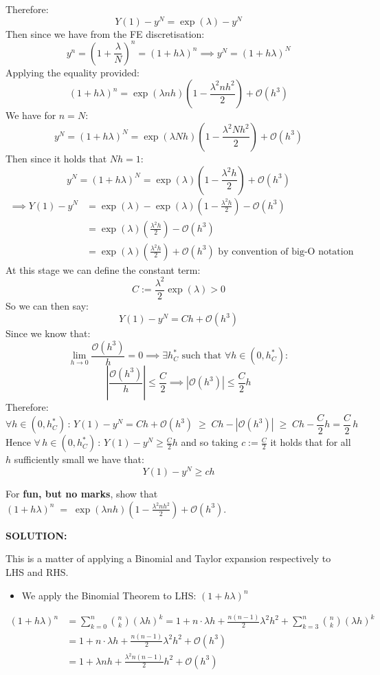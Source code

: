 \documentclass[]{article}
\begin{document}
\noindent Therefore:
\[
Y(1) - y^N = \exp({\lambda}) - y^N
\]
\noindent Then since we have from the FE discretisation:
\[
y^n = \left(1+ \frac{\lambda}{N}\right)^n =(1+h\lambda)^n \implies y^N = (1+h\lambda)^N
\]
\noindent Applying the equality provided:
\[
(1+h\lambda)^n = \exp(\lambda n h)\left(1-\frac{\lambda^2 n h^2}{2}\right)+\mathcal{O}(h^3)
\]
\noindent We have for $n=N$:
\[
y^N = (1+h\lambda)^N = \exp(\lambda N h)\left(1-\frac{\lambda^2 N h^2}{2}\right)+\mathcal{O}(h^3)
\]
\noindent Then since it holds that $Nh = 1$:
\[
y^N = (1+h\lambda)^N = \exp(\lambda)\left(1-\frac{\lambda^2h}{2}\right)+\mathcal{O}(h^3) \]
\begin{align*}
 \implies Y(1)-y^N &= \exp({\lambda}) - \exp(\lambda)\left(1-\frac{\lambda^2h}{2}\right)-\mathcal{O}(h^3)\\
    &=  \exp({\lambda}) \left(\frac{\lambda^2h}{2} \right)-\mathcal{O}(h^3)\\
     &=  \exp({\lambda}) \left(\frac{\lambda^2h}{2} \right)+\mathcal{O}(h^3) \text{ by convention of big-O notation} 
\end{align*}
\noindent At this stage we can define the constant term:
\[
C:= \frac{\lambda^2}{2}\exp({\lambda}) > 0
\]
\noindent So we can then say:
\[
Y(1)-y^N = Ch + \mathcal{O}(h^3)
\]
\noindent Since we know that:
\[
\lim_{h\to 0} \frac{\mathcal{O}(h^3)}{h} = 0 \implies \exists h^*_C\text{ such that } \forall h\in(0,h^*_C):\]
\[
\left|\frac{\mathcal{O}(h^3)}{h}\right| \leq \frac{C}{2} \implies \left|\mathcal{O}(h^3)\right| \leq \frac{C}{2}h
\]
\noindent Therefore:
\[
\forall h \in (0,h_C^*)\,:\,Y(1)-y^N = Ch + \mathcal{O}(h^3) 
\;\geq\; Ch - \left|\mathcal{O}(h^3)\right|
\;\geq\; Ch - \frac{C}{2}h
= \frac{C}{2}\,h
\]
Hence $\displaystyle \forall\, h \in (0,h_C^*)\,:\,Y(1)-y^N   \geq \frac{C}{2}h$ and so taking $c:=\frac{C}{2}$ it holds that for all $h$ sufficiently small we have that:
\[
Y(1)-y^N   \geq c h
\]

\noindent For \textbf{fun, but no marks}, show that
$
(1+h\lambda)^n \;=\; \exp(\lambda n h)\left(1-\frac{\lambda^2 n h^2}{2}\right)+\mathcal{O}(h^3).
$\newline

\noindent\textbf{SOLUTION:}\newline

\noindent This is a matter of applying a Binomial and Taylor expansion respectively to LHS and RHS.

\begin{itemize}
    \item We apply the Binomial Theorem to LHS: $(1+h\lambda)^n $
\end{itemize}
\begin{align*}
(1+h\lambda)^n  &=  \sum_{k=0}^n \binom{n}{k} (\lambda h)^k = 1+n\cdot\lambda h +  \frac{n(n-1)}{2}\lambda^2 h^2 + \sum_{k=3}^n \binom{n}{k} (\lambda h)^k \\
&= 1+n\cdot\lambda h +  \frac{n(n-1)}{2}\lambda^2 h^2 + \mathcal{O}(h^3)\\
&= 1 + \lambda n h + \frac{\lambda^2 n(n-1)}{2}h^2 + \mathcal{O}(h^3)
\end{align*}
\end{document}
